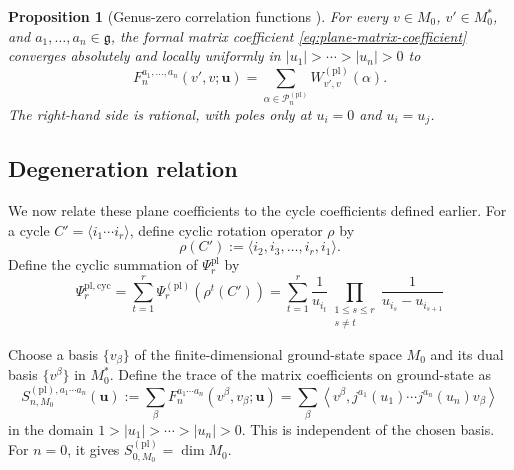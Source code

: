 \documentclass[11pt,a4paper]{amsart}
\numberwithin{equation}{section}
\newtheorem{proposition}[theorem]{Proposition}
\theoremstyle{definition}
\theoremstyle{remark}
\newcommand{\g}{\mathfrak g}
\newcommand{\cP}{\mathcal P}
\newcommand{\ubf}{\boldsymbol u}
\begin{document}
\begin{proposition}[Genus-zero correlation functions \cite{FrenkelZhu}]
\label{prop:plane-chain-cycle}
For every $v\in M_0$, $v'\in M_0^*$, and $a_1,\ldots,a_n\in\g$, the formal matrix coefficient \eqref{eq:plane-matrix-coefficient} converges absolutely and locally uniformly in $|u_1|>\cdots>|u_n|>0$ to
\begin{equation}
 F^{a_1,\ldots,a_n}_n(v',v;\ubf)
 =\sum_{\alpha\in\cP_n^{(\mathrm{pl})}}
 W_{v',v}^{(\mathrm{pl})}(\alpha).
 \label{eq:plane-chain-cycle-formula}
\end{equation}
The right-hand side is rational, with poles only at $u_i=0$ and $u_i=u_j$.
\end{proposition}


\subsection{Degeneration relation}

We now relate these plane coefficients to the cycle coefficients defined earlier.  For a cycle $C'=\langle i_1\cdots i_r\rangle$, define cyclic rotation operator $\rho$ by
\begin{equation*}
 \rho(C'):=\langle i_{2},i_{3},\ldots,i_{r},i_1\rangle.
\end{equation*}
Define the cyclic summation of $\Psi_r^{\mathrm{pl}}$ by
\begin{equation}
\Psi_r^{\mathrm{pl,cyc}}=\sum_{t=1}^r\Psi_r^{(\mathrm{pl})}(\rho^t(C')) =\sum_{t=1}^r\frac1{u_{i_t}}
 \prod_{\substack{1\leq s\leq r\\s\neq t}}
 \frac1{u_{i_s}-u_{i_{s+1}}}
\end{equation}

Choose a basis $\{v_\beta\}$ of the finite-dimensional ground-state space $M_0$ and its dual basis $\{v^\beta\}$ in $M_0^*$. Define the trace of the matrix coefficients on ground-state as
\begin{equation}
 S_{n,M_0}^{(\mathrm{pl}),a_1\cdots a_n}(\ubf)
 :=\sum_\beta F^{a_1\cdots a_n}_n(v^\beta,v_\beta;\ubf)
 =\sum_\beta
 \left\langle v^\beta,
 j^{a_1}(u_1)\cdots j^{a_n}(u_n)v_\beta
 \right\rangle
 \label{eq:plane-ground-block}
\end{equation}
in the domain $1>|u_1|>\cdots>|u_n|>0$.  This is independent of the chosen basis. For $n=0$, it gives $S_{0,M_0}^{(\mathrm{pl})}=\dim M_0$.
\end{document}
